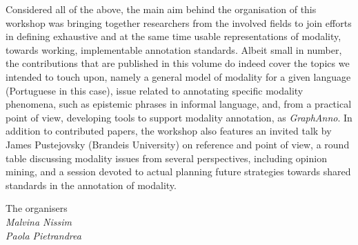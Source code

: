 \documentclass[11pt]{article}
\begin{document}
Considered all of the above, the main aim behind the organisation of this workshop was bringing together researchers from the involved fields to join efforts in defining exhaustive and at the same time usable representations of modality, towards working, implementable annotation standards. Albeit small in number, the contributions that are published in this volume do indeed cover the topics we intended to touch upon, namely a general model of modality for a given language (Portuguese in this case), issue related to annotating specific modality phenomena,  such as epistemic phrases in informal language, and, from a practical point of view, developing tools to support modality annotation, as \textit{GraphAnno}. In addition to contributed papers, the workshop also features an invited talk by James Pustejovsky (Brandeis University) on reference and point of view, a round table discussing modality issues from several perspectives, including opinion mining, and a session devoted to actual planning future strategies towards shared standards in the annotation of modality.

\bigskip
The organisers\\
\textit{Malvina Nissim}\\
\textit{Paola Pietrandrea}
\end{document}
